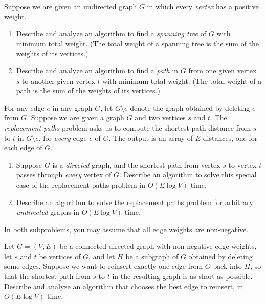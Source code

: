 \begin{exercises}
\item Suppose we are given an undirected graph $G$ in which every \textit{vertex} has a positive weight.
\begin{enumerate}
\item Describe and analyze an algorithm to find a \textit{spanning tree} of $G$ with minimum total weight.
(The total weight of a spanning tree is the sum of the weights of its vertices.)
\item Describe and analyze an algorithm to find a \textit{path} in $G$ from one given vertex $s$ to another given vertex $t$ with minimum total weight.
(The total weight of a path is the sum of the weights of its vertices.)
\end{enumerate}

\item For any edge $e$ in any graph $G$, let $G \setminus e$ denote the graph obtained by deleting $e$ from $G$.
Suppose we are given a graph $G$ and two vertices $s$ and $t$.
The \textit{replacement paths} problem asks us to compute the shortest-path distance from $s$ to $t$ in $G \setminus e$, for \textit{every} edge $e$ of $G$.
The output is an array of $E$ distances, one for each edge of $G$.
\begin{enumerate}
\item Suppose $G$ is a \textit{directed} graph, and the shortest path from vertex $s$ to vertex $t$ passes through \textit{every} vertex of $G$.
Describe an algorithm to solve this special case of the replacement paths problem in $O(E \log V)$ time.
\item {} Describe an algorithm to solve the replacement paths problem for arbitrary \textit{undirected} graphs in $O(E \log V)$ time.
\end{enumerate}
In both subproblems, you may assume that all edge weights are non-negative.

\item Let $G = (V, E)$ be a connected directed graph with non-negative edge weights, let $s$ and $t$ be vertices of $G$, and let $H$ be a subgraph of $G$ obtained by deleting some edges.
Suppose we want to reinsert exactly one edge from $G$ back into $H$, so that the shortest path from $s$ to $t$ in the resulting graph is as short as possible.
Describe and analyze an algorithm that chooses the best edge to reinsert, in $O(E \log V)$ time.


\end{exercises}
